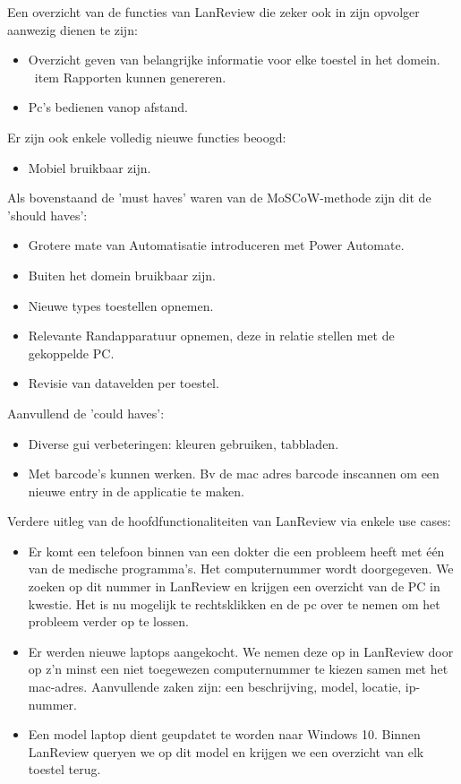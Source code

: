 Een overzicht van de functies van LanReview die zeker ook in zijn opvolger aanwezig dienen te zijn:
\begin{itemize}
    \item  Overzicht geven van belangrijke informatie voor elke toestel in het domein.
    \ item Rapporten kunnen genereren.
\item Pc’s bedienen vanop afstand.
\end{itemize}
Er zijn ook enkele volledig nieuwe functies beoogd:
\begin{itemize}
\item Mobiel bruikbaar zijn.
\end{itemize}
Als bovenstaand de 'must haves' waren van de MoSCoW-methode zijn dit de 'should haves':
\begin{itemize}
    \item Grotere mate van Automatisatie introduceren met Power Automate.
    \item Buiten het domein bruikbaar zijn.
    \item Nieuwe types toestellen opnemen.
    \item Relevante Randapparatuur opnemen, deze in relatie stellen met de gekoppelde PC.
    \item Revisie van datavelden per toestel.
\end{itemize}
Aanvullend de 'could haves':
\begin{itemize}
    \item Diverse gui verbeteringen: kleuren gebruiken, tabbladen.
    \item Met barcode's kunnen werken. Bv de mac adres barcode inscannen om een nieuwe entry in de applicatie te maken.
\end{itemize}

\vspace{5mm}

Verdere uitleg van de hoofdfunctionaliteiten van LanReview via enkele use cases:
\begin{itemize}
    \item Er komt een telefoon binnen van een dokter die een probleem heeft met één van de medische programma's. Het computernummer wordt doorgegeven. We zoeken op dit nummer in LanReview en krijgen een overzicht van de PC in kwestie. Het is nu mogelijk te rechtsklikken en de pc over te nemen om het probleem verder op te lossen.
    \item Er werden nieuwe laptops aangekocht. We nemen deze op in LanReview door op z'n minst een niet toegewezen computernummer te kiezen samen met het mac-adres. Aanvullende zaken zijn: een beschrijving, model, locatie, ip-nummer.
    \item Een model laptop dient geupdatet te worden naar Windows 10. Binnen LanReview queryen we op dit model en krijgen we een overzicht van elk toestel terug.
\end{itemize}


